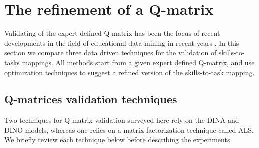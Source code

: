 \section{The refinement of a Q-matrix}
\label{edm2014}

Validating of the expert defined Q-matrix has been the focus of recent developments in the field of educational data mining in recent years \citep{delaTorre2008,chiu2013statistical,barnes2010novel,loye2011validite,Desmarais2013aied}.
In this section we compare three data driven techniques for the validation of skills-to-tasks mappings.  All methods start from a given expert defined Q-matrix, and use optimization techniques to suggest a refined version of the skills-to-task mapping.  


\subsection{Q-matrices validation techniques}

Two techniques for Q-matrix validation surveyed here rely on the DINA and DINO models, whereas one relies on a matrix factorization technique called ALS.  We briefly review each technique below before describing the experiments.


